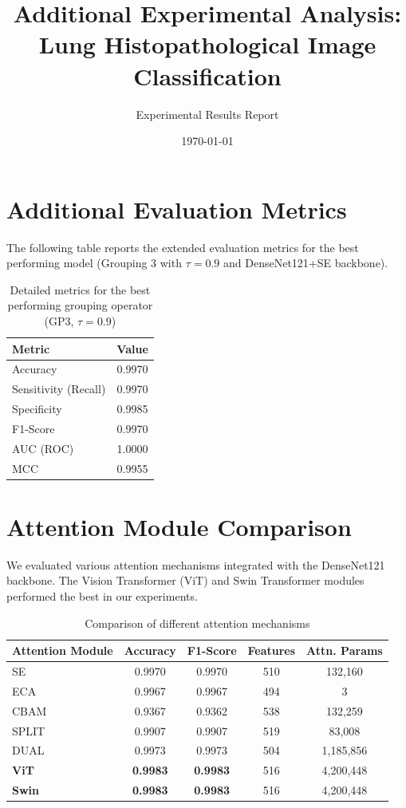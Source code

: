 \documentclass[a4paper,12pt]{article}
\begin{document}
\title{Additional Experimental Analysis: Lung Histopathological Image Classification}
\author{Experimental Results Report}
\date{\today}
\maketitle

\section{Additional Evaluation Metrics}
The following table reports the extended evaluation metrics for the best performing model (Grouping 3 with $\tau = 0.9$ and DenseNet121+SE backbone).

\begin{table}[H]
\centering
\caption{Detailed metrics for the best performing grouping operator (GP3, $\tau=0.9$)}
\begin{tabular}{lc}
\toprule
\textbf{Metric} & \textbf{Value} \\
\midrule
Accuracy & 0.9970 \\
Sensitivity (Recall) & 0.9970 \\
Specificity & 0.9985 \\
F1-Score & 0.9970 \\
AUC (ROC) & 1.0000 \\
MCC & 0.9955 \\
\bottomrule
\end{tabular}
\end{table}

\section{Attention Module Comparison}
We evaluated various attention mechanisms integrated with the DenseNet121 backbone. The Vision Transformer (ViT) and Swin Transformer modules performed the best in our experiments.

\begin{table}[H]
\centering
\caption{Comparison of different attention mechanisms}
\begin{tabular}{lcccc}
\toprule
\textbf{Attention Module} & \textbf{Accuracy} & \textbf{F1-Score} & \textbf{Features} & \textbf{Attn. Params} \\
\midrule
SE & 0.9970 & 0.9970 & 510 & 132,160 \\
ECA & 0.9967 & 0.9967 & 494 & 3 \\
CBAM & 0.9367 & 0.9362 & 538 & 132,259 \\
SPLIT & 0.9907 & 0.9907 & 519 & 83,008 \\
DUAL & 0.9973 & 0.9973 & 504 & 1,185,856 \\
\textbf{ViT} & \textbf{0.9983} & \textbf{0.9983} & 516 & 4,200,448 \\
\textbf{Swin} & \textbf{0.9983} & \textbf{0.9983} & 516 & 4,200,448 \\
\bottomrule
\end{tabular}
\end{table}
\end{document}
